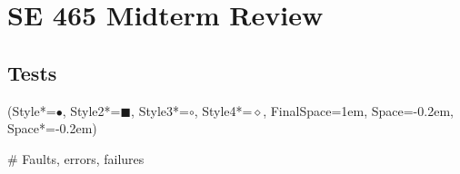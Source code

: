 \documentclass[11pt, oneside]{article}
\newcommand*{\begineasylist}{\begin{easylist}[itemize]\ListProperties(Style*=$\bullet$\quad, Style2*=\tiny$\blacksquare$\quad, Style3*=$\circ$\quad, Style4*=$\diamond$\quad, FinalSpace=1em, Space=-0.2em, Space*=-0.2em)}
\begin{document}
\section*{SE 465 Midterm Review}

\subsection*{Tests}
\begineasylist

# Faults, errors, failures


\end{easylist}
\end{document}
